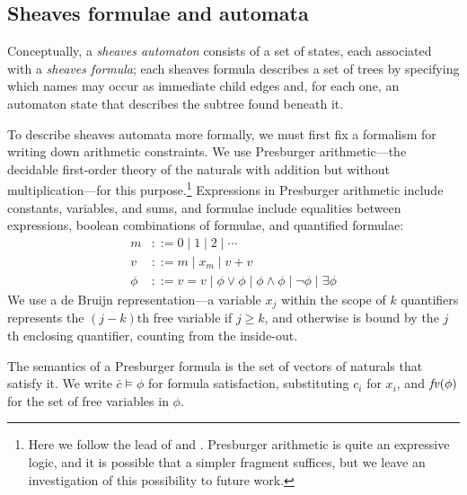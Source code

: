 \subsection{Sheaves formulae and automata}

Conceptually, a {\em sheaves automaton} consists of a set of states, each
associated with a {\em sheaves formula}; each sheaves formula describes a
set of trees by specifying which names may occur as immediate child edges
and, for each one, an automaton state that describes the subtree found
beneath it.

To describe sheaves automata more formally, we must first fix a formalism
for writing down arithmetic constraints. We use Presburger arithmetic---the
decidable first-order theory of the naturals with addition but without
multiplication---for this purpose.\footnote{Here we follow the lead of
\cite{Foster:FTL} and \cite{DalzilioS:POPL04}. Presburger arithmetic is
quite an expressive logic, and it is possible that a simpler fragment
suffices, but we leave an investigation of this possibility to future
work.} Expressions in Presburger arithmetic include
constants, variables, and sums, and formulae include equalities
between expressions, boolean combinations of formulae, and quantified
formulae:
\begin{align*}
    m &::= 0 \mid 1 \mid 2 \mid \cdots \\
    v &::= m \mid x_m \mid v+v \\
    \phi &::= v = v \mid \phi \lor \phi \mid \phi \land \phi
    \mid \lnot \phi \mid \exists \phi
\end{align*}
\noindent
We use a de Bruijn representation---a variable \(x_j\) within the
scope of \(k\) quantifiers represents the \((j-k)\)th free variable if
\(j \geq k\), and otherwise is bound by the \(j\)th enclosing
quantifier, counting from the inside-out.

The semantics of a Presburger formula is the set of vectors of
naturals that satisfy it. 
%
We write $\bar c \vDash \phi$ for formula satisfaction, substituting
$c_i$ for $x_i$, and $\mathit{fv}(\phi)$ for the set of free variables in $\phi$.

\newcommand{\ELEMENT}[2]{(#1, #2)}
\newcommand{\FORMULA}[3]{(#1, #2, #3)}
\newcommand{\VECTOR}[1]{(#1)}
\newcommand{\PNEG}[1]{\lnot{#1}}
\newcommand{\E}{E}

